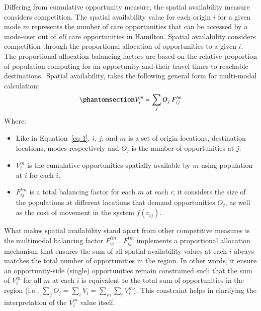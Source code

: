 \documentclass[
  authoryear,
  preprint,
  3p]{elsarticle}
\providecommand{\tightlist}{%
  \setlength{\itemsep}{0pt}\setlength{\parskip}{0pt}}\usepackage{longtable,booktabs,array}
\def\tightlist{}
\begin{document}
Differing from cumulative opportunity measure, the spatial availability
measure considers competition. The spatial availability value for each
origin \(i\) for a given mode \(m\) represents the number of care
opportunities that can be accessed by a mode-user out of \emph{all} care
opportunities in Hamilton. Spatial availability considers competition
through the proportional allocation of opportunities to a given \(i\).
The proportional allocation balancing factors are based on the relative
proportion of population computing for an opportunity and their travel
times to reachable destinations.~Spatial availability, takes the
following general form for multi-modal calculation:
\begin{equation}\phantomsection\label{eq-2}{
V^m_{i} = \sum_{j} O_j\ F^{tm}_{ij}
}\end{equation} \noindent Where:

\begin{itemize}
\tightlist
\item
  Like in Equation~\ref{eq-1}, \(i\), \(j\), and \(m\) is a set of
  origin locations, destination locations, modes respectively and
  \(O_j\) is the number of opportunities at \(j\).
\item
  \(V^m_{i}\) is the cumulative opportunities spatially available by
  \(m\)-using population at \(i\) for each \(i\).
\item
  \(F^{tm}_{ij}\) is a total balancing factor for each \(m\) at each
  \(i\); it considers the size of the populations at different locations
  that demand opportunities \(O_j\), as well as the cost of movement in
  the system \(f(c_{ij})\).
\end{itemize}

What makes spatial availability stand apart from other competitive
measures is the multimodal balancing factor \(F^{tm}_{ij}\)
\citep[see][]{soukhovMultimodalSpatialAvailability2024, soukhovIntroducingSpatialAvailability2023}.
\(F^{tm}_{ij}\) implements a proportional allocation mechanism that
ensures the sum of all spatial availability values at each \(i\) always
matches the total number of opportunities in the region. In other words,
it ensure an opportunity-side (single) opportunities remain constrained
such that the sum of \(V^m_{i}\) for all \(m\) at each \(i\) is
equivalent to the total sum of opportunities in the region (i.e.,
\(\sum_j O_j = \sum_i V_i = \sum_{m} \sum_{i} V^m_{i}\)). This
constraint helps in clarifying the interpretation of the \(V^m_{i}\)
value itself.
\end{document}
